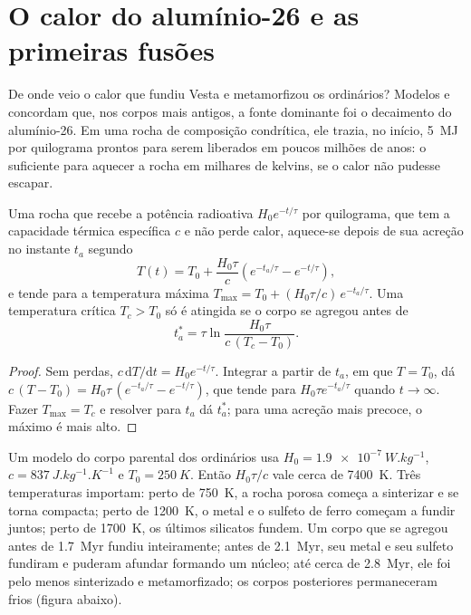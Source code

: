 \section{O calor do alumínio-26 e as primeiras fusões}

De onde veio o calor que fundiu Vesta e metamorfizou os 
ordinários? Modelos e  concordam que, nos corpos mais antigos,
a fonte dominante foi o decaimento do alumínio-26. Em uma rocha de composição condrítica, ele trazia, no início,
\qty{5}{MJ} por quilograma prontos para serem liberados em poucos milhões de anos:
o suficiente para aquecer a rocha em milhares de kelvins, se o calor não pudesse escapar.

\begin{proposition}
\label{prop:b2:planet-formation-meteorites:heating}
Uma rocha que recebe a potência radioativa $H_0 e^{-t/\tau}$ por quilograma, que tem
a capacidade térmica específica $c$ e não perde calor, aquece-se depois de sua acreção no
instante $t_a$ segundo
\[
  T(t) = T_0 + \frac{H_0\tau}{c}\left(e^{-t_a/\tau} - e^{-t/\tau}\right),
\]
e tende para a temperatura máxima
$T_{\max} = T_0 + (H_0\tau/c)\,e^{-t_a/\tau}$. Uma temperatura crítica
$T_c > T_0$ só é atingida se o corpo se agregou antes de
\[
  t_a^* = \tau\ln\frac{H_0\tau}{c\,(T_c - T_0)}.
\]
\end{proposition}

\begin{proof}
Sem perdas, $c\,\mathrm dT/\mathrm dt = H_0 e^{-t/\tau}$. Integrar a partir de
$t_a$, em que $T = T_0$, dá
$c\,(T - T_0) = H_0\tau\,(e^{-t_a/\tau} - e^{-t/\tau})$, que tende para
$H_0\tau e^{-t_a/\tau}$ quando $t \to \infty$. Fazer $T_{\max} = T_c$ e resolver
para $t_a$ dá $t_a^*$; para uma acreção mais precoce, o máximo é mais alto.
\end{proof}

Um modelo do corpo parental dos  ordinários usa
$H_0 = \qty{1.9e-7}{W.kg^{-1}}$, $c = \qty{837}{J.kg^{-1}.K^{-1}}$ e
$T_0 = \qty{250}{K}$. Então $H_0\tau/c$ vale cerca de \qty{7400}{K}. Três
temperaturas importam: perto de \qty{750}{K}, a rocha porosa começa a sinterizar e se torna
compacta; perto de \qty{1200}{K}, o metal e o sulfeto de ferro começam a fundir
juntos; perto de \qty{1700}{K}, os últimos silicatos fundem. Um corpo que se agregou
antes de \qty{1.7}{Myr} fundiu inteiramente; antes de \qty{2.1}{Myr}, seu metal e seu sulfeto
fundiram e puderam afundar formando um núcleo; até cerca de \qty{2.8}{Myr}, ele foi pelo menos
sinterizado e metamorfizado; os corpos posteriores permaneceram frios (figura abaixo).

